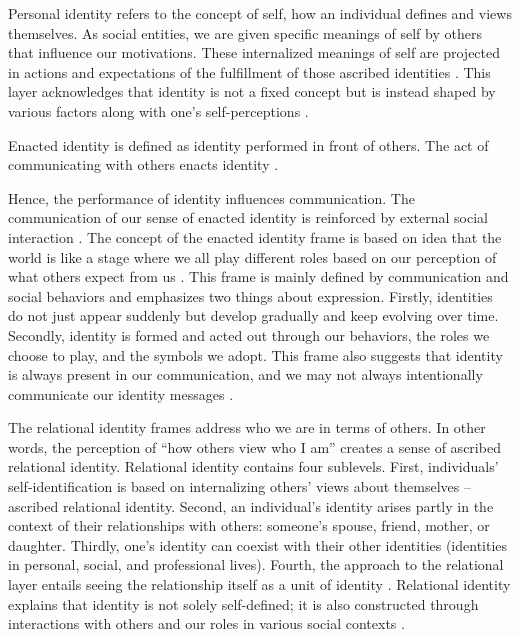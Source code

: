 Personal identity refers to the concept of self, how an individual defines and views themselves. As social entities, we are given specific meanings of self by others that influence our motivations. These internalized meanings of self are projected in actions and expectations of the fulfillment of those ascribed identities \citep{kuiperCommunicationTheoryIdentity2021, jungElaboratingCommunicationTheory2004}. This layer acknowledges that identity is not a fixed concept but is instead shaped by various factors along with one’s self-perceptions \citep{hechtCommunicationTheoryIdentity2021, shinCommunicationTheoryIdentity2017}.

Enacted identity is defined as identity performed in front of others. The act of communicating with others enacts identity \citep{jungElaboratingCommunicationTheory2004, hecht2002ResearchOdyssey1993}.

Hence, the performance of identity influences communication. The communication of our sense of enacted identity is reinforced by external social interaction \citep{shinCommunicationTheoryIdentity2017}. The concept of the enacted identity frame is based on \citet{goffmanPresentationSelfEveryday2007} idea that the world is like a stage where we all play different roles based on our perception of what others expect from us \citep{jungElaboratingCommunicationTheory2004}. This frame is mainly defined by communication and social behaviors and emphasizes two things about expression. Firstly, identities do not just appear suddenly but develop gradually and keep evolving over time. Secondly, identity is formed and acted out through our behaviors, the roles we choose to play, and the symbols we adopt. This frame also suggests that identity is always present in our communication, and we may not always intentionally communicate our identity messages \citep{kuiperCommunicationTheoryIdentity2021, shinCommunicationTheoryIdentity2017}.

The relational identity frames address who we are in terms of others. In other words, the perception of ``how others view who I am'' creates a sense of ascribed relational identity. Relational identity contains four sublevels. First, individuals’ self-identification is based on internalizing others’ views about themselves – ascribed relational identity. Second, an individual’s identity arises partly in the context of their relationships with others: someone’s spouse, friend, mother, or daughter.  Thirdly, one’s identity can coexist with their other identities (identities in personal, social, and professional lives). Fourth, the approach to the relational layer entails seeing the relationship itself as a unit of identity \citep{jungElaboratingCommunicationTheory2004}. Relational identity explains that identity is not solely self-defined; it is also constructed through interactions with others and our roles in various social contexts \citep{hechtCommunicationTheoryIdentity2021}. 

